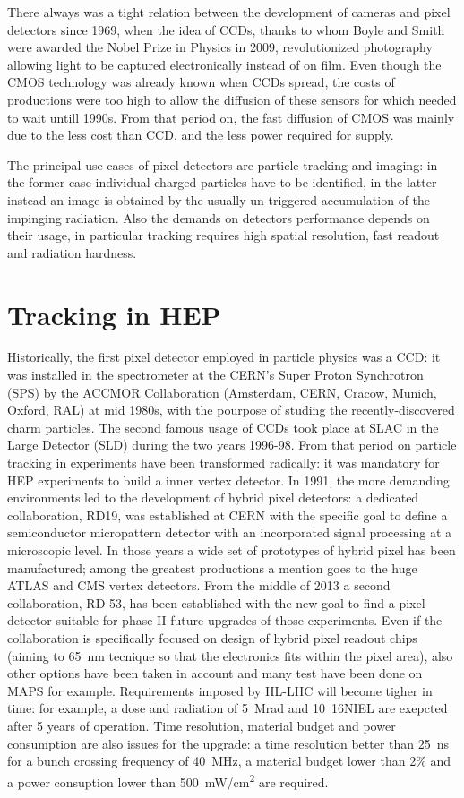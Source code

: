 There always was a tight relation between the development of cameras and pixel detectors since 1969, when the idea of CCDs, thanks to whom Boyle and Smith were awarded the Nobel Prize in Physics in 2009, revolutionized photography allowing light to be captured electronically instead of on film. 
Even though the CMOS technology was already known when CCDs spread, the costs of productions were too high to allow the diffusion of these sensors for which needed to wait untill 1990s. From that period on, the fast diffusion of CMOS was mainly due to the less cost than CCD, and the less power required for supply. 

The principal use cases of pixel detectors are particle tracking and imaging: in the former case individual charged particles have to be identified, in the latter instead an image is obtained by the usually un-triggered accumulation of the impinging radiation. 
Also the demands on detectors performance depends on their usage, in particular tracking requires high spatial resolution, fast readout and radiation hardness. 


\section{Tracking in HEP}
    Historically, the first pixel detector employed in particle physics was a CCD: it was installed in the spectrometer at the CERN’s Super Proton Synchrotron (SPS) by the ACCMOR Collaboration (Amsterdam, CERN, Cracow, Munich, Oxford, RAL) at mid 1980s, with the pourpose of studing the recently-discovered charm particles.
    The second famous usage of CCDs took place at SLAC in the Large Detector (SLD) during the two years 1996-98. From that period on particle tracking in experiments have been transformed radically: it was mandatory for HEP experiments to build a inner vertex detector. 
    In 1991, the more demanding environments led to the development of hybrid pixel detectors: a dedicated collaboration, RD19, was established at CERN with the specific goal to define a semiconductor micropattern detector with an incorporated signal processing at a microscopic level. 
    In those years a wide set of prototypes of hybrid pixel has been manufactured; among the greatest productions a mention goes to the huge ATLAS and CMS vertex detectors. 
    From the middle of 2013 a second collaboration, RD 53, has been established with the new goal to find a pixel detector suitable for phase II future upgrades of those experiments. Even if the collaboration is specifically focused on design of hybrid pixel readout chips (aiming to \SI{65}{nm} tecnique so that the electronics fits within the pixel area), also other options have been taken in account and many test have been done on MAPS for example. Requirements imposed by HL-LHC will become tigher in time: for example, a dose and radiation of \SI{5}{Mrad} and \si{10 {16}}{NIEL} are exepcted after 5 years of operation. Time resolution, material budget and power consumption are also issues for the upgrade: a time resolution better than \SI{25}{ns} for a bunch crossing frequency of \SI{40}{MHz}, a material budget lower than 2\% and a power consuption lower than  \SI{500}{mW/cm\squared} are required. 

